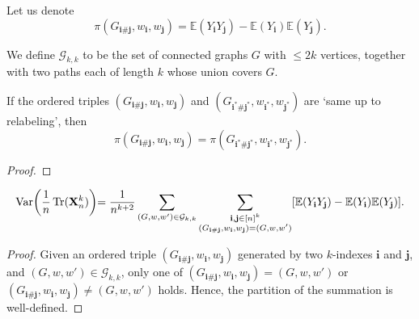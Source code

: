 \begin{definition}[R-2-1]
  \label{}%
  \uses{}%
  Let us denote
  \[
  \pi(G_{\mathbf{i}\#\mathbf{j}},w_\mathbf{i},w_\mathbf{j}) = \mathbb{E}(Y_\mathbf{i} Y_\mathbf{j}) - \mathbb{E}(Y_\mathbf{i}) \mathbb{E}(Y_\mathbf{j}).
  \]
\end{definition}
\begin{definition}[R-2-2]
  \label{g_k.k}%
  \uses{}%
  We define $\mathcal{G}_{k,k}$ to be the set of connected graphs $G$ with $\leq 2k$ vertices, 
  together with two paths each of length $k$ whose union covers $G$.
\end{definition}
\begin{lemma}[R-2-3]
  \label{}%
  \uses{}%
  If the ordered triples $(G_{\mathbf{i}\#\mathbf{j}},w_\mathbf{i},w_\mathbf{j})$ and $(G_{\mathbf{i}^*\#\mathbf{j}^*},w_{\mathbf{i}^*},w_{\mathbf{j}^*})$ are `same up to relabeling', then
  \[
  \pi(G_{\mathbf{i}\#\mathbf{j}},w_\mathbf{i},w_\mathbf{j}) = \pi(G_{\mathbf{i}^*\#\mathbf{j}^*},w_{\mathbf{i}^*},w_{\mathbf{j}^*}).
  \]
\end{lemma}
\begin{proof}
\end{proof}
\begin{lemma}[R-2-4]
  \label{}%
  \uses{}%
  \[
  \text{Var} \biggl(\frac{1}{n} \operatorname{Tr} (\mathbf{X}_n^k) \biggl) 
  = \frac{1}{n^{k+2}} \sum_{(G,w,w') \in \mathcal{G}_{k,k}} \sum_{\substack{\mathbf{i},\mathbf{j} \in [n]^k \\ (G_{\mathbf{i}\#\mathbf{j}},w_\mathbf{i},w_\mathbf{j}) = (G,w,w')}} [\mathbb{E}(Y_\mathbf{i} Y_\mathbf{j}) - \mathbb{E}(Y_\mathbf{i}) \mathbb{E}(Y_\mathbf{j})].
  \]
\end{lemma}
\begin{proof}
  Given an ordered triple $(G_{\mathbf{i}\#\mathbf{j}},w_\mathbf{i},w_\mathbf{j})$ generated by two $k$-indexes $\mathbf{i}$ and $\mathbf{j}$, and $(G,w,w') \in \mathcal{G}_{k,k}$, 
  only one of $(G_{\mathbf{i}\#\mathbf{j}},w_\mathbf{i},w_\mathbf{j}) = (G,w,w')$ or $(G_{\mathbf{i}\#\mathbf{j}},w_\mathbf{i},w_\mathbf{j}) \neq (G,w,w')$ holds. 
  Hence, the partition of the summation is well-defined.
\end{proof}
